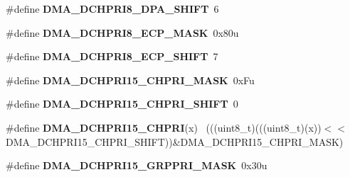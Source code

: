 \begin{DoxyCompactItemize}
\item 
\hypertarget{group___d_m_a___register___masks_gafb506e73fabed6916d50868ca9189bf4}{}\#define {\bfseries D\+M\+A\+\_\+\+D\+C\+H\+P\+R\+I8\+\_\+\+D\+P\+A\+\_\+\+S\+H\+I\+F\+T}~6\label{group___d_m_a___register___masks_gafb506e73fabed6916d50868ca9189bf4}

\item 
\hypertarget{group___d_m_a___register___masks_ga853ddcde9ef1ca6dcdb2a5742bb4c081}{}\#define {\bfseries D\+M\+A\+\_\+\+D\+C\+H\+P\+R\+I8\+\_\+\+E\+C\+P\+\_\+\+M\+A\+S\+K}~0x80u\label{group___d_m_a___register___masks_ga853ddcde9ef1ca6dcdb2a5742bb4c081}

\item 
\hypertarget{group___d_m_a___register___masks_ga0717f20f481144abf2d14c7d9c67e289}{}\#define {\bfseries D\+M\+A\+\_\+\+D\+C\+H\+P\+R\+I8\+\_\+\+E\+C\+P\+\_\+\+S\+H\+I\+F\+T}~7\label{group___d_m_a___register___masks_ga0717f20f481144abf2d14c7d9c67e289}

\item 
\hypertarget{group___d_m_a___register___masks_ga9dff6549497c3518454e82bb9f5c88a9}{}\#define {\bfseries D\+M\+A\+\_\+\+D\+C\+H\+P\+R\+I15\+\_\+\+C\+H\+P\+R\+I\+\_\+\+M\+A\+S\+K}~0x\+Fu\label{group___d_m_a___register___masks_ga9dff6549497c3518454e82bb9f5c88a9}

\item 
\hypertarget{group___d_m_a___register___masks_ga5e81f55c9806dcfa91352c763197b4cd}{}\#define {\bfseries D\+M\+A\+\_\+\+D\+C\+H\+P\+R\+I15\+\_\+\+C\+H\+P\+R\+I\+\_\+\+S\+H\+I\+F\+T}~0\label{group___d_m_a___register___masks_ga5e81f55c9806dcfa91352c763197b4cd}

\item 
\hypertarget{group___d_m_a___register___masks_gaf1f4788ca862e23155598c29381bcba6}{}\#define {\bfseries D\+M\+A\+\_\+\+D\+C\+H\+P\+R\+I15\+\_\+\+C\+H\+P\+R\+I}(x)                                    ~(((uint8\+\_\+t)(((uint8\+\_\+t)(x))$<$$<$D\+M\+A\+\_\+\+D\+C\+H\+P\+R\+I15\+\_\+\+C\+H\+P\+R\+I\+\_\+\+S\+H\+I\+F\+T))\&D\+M\+A\+\_\+\+D\+C\+H\+P\+R\+I15\+\_\+\+C\+H\+P\+R\+I\+\_\+\+M\+A\+S\+K)\label{group___d_m_a___register___masks_gaf1f4788ca862e23155598c29381bcba6}

\item 
\hypertarget{group___d_m_a___register___masks_gaf10165f68ef55f0b71602a010e087679}{}\#define {\bfseries D\+M\+A\+\_\+\+D\+C\+H\+P\+R\+I15\+\_\+\+G\+R\+P\+P\+R\+I\+\_\+\+M\+A\+S\+K}~0x30u\label{group___d_m_a___register___masks_gaf10165f68ef55f0b71602a010e087679}


\end{DoxyCompactItemize}
